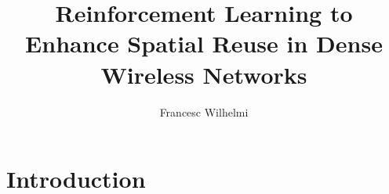 \documentclass[12pt, a4paper,twoside]{tesi_upf}
\title{Reinforcement Learning to Enhance Spatial Reuse in Dense Wireless Networks}
\author{Francesc Wilhelmi}
\begin{document}
	\frontmatter
	
	\maketitle
	
	\cleardoublepage
	
	
	\mainmatter
	
	\tableofcontents
	
	\chapter{Introduction}
	\label{section:introduction}	
	
\end{document}
